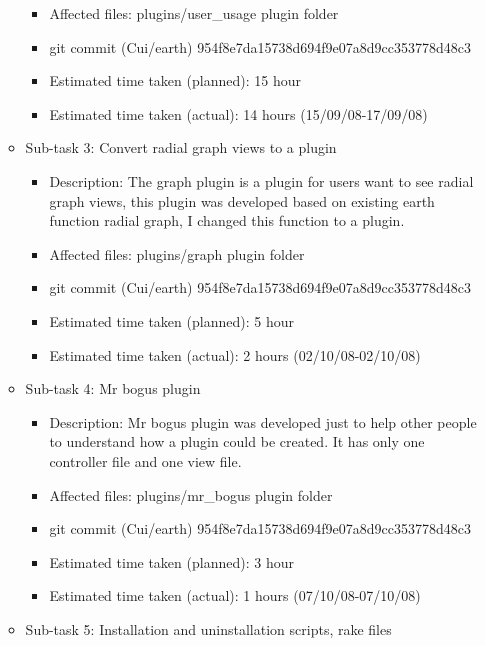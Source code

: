 \begin{itemize}
\begin{itemize}
\begin{itemize}
                    \item Affected files: plugins/user\_usage plugin folder
                    \item git commit (Cui/earth) 954f8e7da15738d694f9e07a8d9cc353778d48c3
                    \item Estimated time taken (planned): 15 hour
                    \item Estimated time taken (actual): 14 hours (15/09/08-17/09/08)
                \end{itemize}
            \item Sub-task 3: Convert radial graph views to a plugin
                \begin{itemize}
                    \item Description: The graph plugin is a plugin for users want to see radial graph views, this plugin was developed based on existing earth function radial graph, I changed this function to a plugin.
                    \item Affected files: plugins/graph plugin folder
                    \item git commit (Cui/earth) 954f8e7da15738d694f9e07a8d9cc353778d48c3
                    \item Estimated time taken (planned): 5 hour
                    \item Estimated time taken (actual): 2 hours (02/10/08-02/10/08)
                \end{itemize}
            \item Sub-task 4: Mr bogus plugin
                \begin{itemize}
                    \item Description: Mr bogus plugin was developed just to help other people to understand how a plugin could be created. It has only one controller file and one view file.
                    \item Affected files: plugins/mr\_bogus plugin folder
                    \item git commit (Cui/earth) 954f8e7da15738d694f9e07a8d9cc353778d48c3
                    \item Estimated time taken (planned): 3 hour
                    \item Estimated time taken (actual): 1 hours (07/10/08-07/10/08)
                \end{itemize}
            \item Sub-task 5: Installation and uninstallation scripts, rake files
                \begin{itemize}

\end{itemize}
\end{itemize}
\end{itemize}
